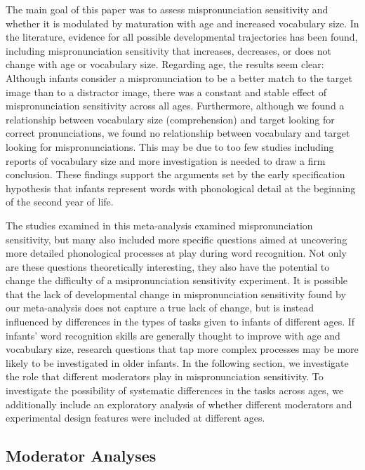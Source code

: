 \documentclass[man]{apa6}
\begin{document}
The main goal of this paper was to assess mispronunciation sensitivity and whether it is modulated by maturation with age and increased vocabulary size. In the literature, evidence for all possible developmental trajectories has been found, including mispronunciation sensitivity that increases, decreases, or does not change with age or vocabulary size. Regarding age, the results seem clear: Although infants consider a mispronunciation to be a better match to the target image than to a distractor image, there was a constant and stable effect of mispronunciation sensitivity across all ages. Furthermore, although we found a relationship between vocabulary size (comprehension) and target looking for correct pronunciations, we found no relationship between vocabulary and target looking for mispronunciations. This may be due to too few studies including reports of vocabulary size and more investigation is needed to draw a firm conclusion. These findings support the arguments set by the early specification hypothesis that infants represent words with phonological detail at the beginning of the second year of life.

The studies examined in this meta-analysis examined mispronunciation sensitivity, but many also included more specific questions aimed at uncovering more detailed phonological processes at play during word recognition. Not only are these questions theoretically interesting, they also have the potential to change the difficulty of a msipronunciation sensitivity experiment. It is possible that the lack of developmental change in mispronunciation sensitivity found by our meta-analysis does not capture a true lack of change, but is instead influenced by differences in the types of tasks given to infants of different ages. If infants' word recognition skills are generally thought to improve with age and vocabulary size, research questions that tap more complex processes may be more likely to be investigated in older infants. In the following section, we investigate the role that different moderators play in mispronunciation sensitivity. To investigate the possibility of systematic differences in the tasks across ages, we additionally include an exploratory analysis of whether different moderators and experimental design features were included at different ages.

\hypertarget{moderator-analyses}{%
\subsection{Moderator Analyses}\label{moderator-analyses}}
\end{document}
